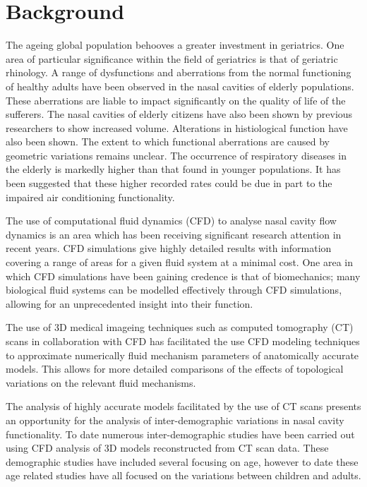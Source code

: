 \section{Background}

The ageing global population behooves a greater investment in geriatrics. One area of particular significance within the field of geriatrics is that of geriatric rhinology. A range of dysfunctions and aberrations from the normal functioning of healthy adults have been observed in the nasal cavities of elderly populations\cite{Edelstein1996, Lindemann2008}. These aberrations are liable to impact significantly on the quality of life of the sufferers. The nasal cavities of elderly citizens have also been shown by previous researchers to show increased volume\cite{Kalmovich2005}. Alterations in histiological function have also been shown\cite{HO2001}. The extent to which functional aberrations are caused by geometric variations remains unclear\cite{Varga-Huettner2013}. The occurrence of respiratory diseases in the elderly is markedly higher than that found in younger populations\cite{HO2001, Edelstein1996}. It has been suggested that these higher recorded rates could be due in part to the impaired air conditioning functionality\cite{Lindemann2008}.

The use of computational fluid dynamics (CFD) to analyse nasal cavity flow dynamics is an area which has been receiving significant research attention in recent years. CFD simulations give highly detailed results with information covering a range of areas for a given fluid system at a minimal cost. One area in which CFD simulations have been gaining credence is that of biomechanics; many biological fluid systems can be modelled effectively through CFD simulations, allowing for an unprecedented insight into their function.

The use of 3D medical imageing techniques such as computed tomography (CT) scans in collaboration with CFD has facilitated the use CFD modeling techniques to approximate numerically fluid mechanism parameters of anatomically accurate models. This allows for more detailed comparisons of the effects of topological variations on the relevant fluid mechanisms.


The analysis of highly accurate models facilitated by the use of CT scans presents an opportunity for the analysis of inter-demographic variations in nasal cavity functionality. To date numerous inter-demographic studies have been carried out using CFD analysis of 3D models reconstructed from CT scan data. These demographic studies have included several focusing on age, however to date these age related studies have all focused on the variations between children and adults.


